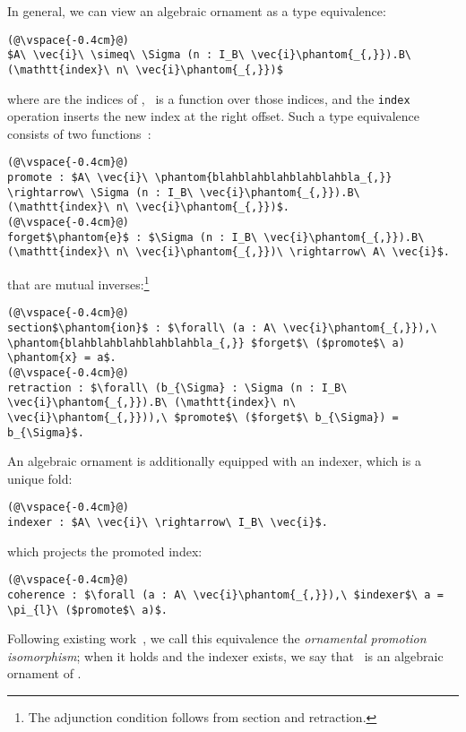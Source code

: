 In general,
we can view an algebraic ornament as a type equivalence: %
\begin{lstlisting}
(@\vspace{-0.4cm}@)
$A\ \vec{i}\ \simeq\ \Sigma (n : I_B\ \vec{i}\phantom{_{,}}).B\ (\mathtt{index}\ n\ \vec{i}\phantom{_{,}})$
\end{lstlisting}
where  are the indices of \Aa, \IB\ is a function over those indices, 
and the \lstinline{index} operation inserts the new index  at the right offset.
Such a type equivalence consists of two functions~\cite{univalent2013homotopy}:
\begin{lstlisting}
(@\vspace{-0.4cm}@)
promote : $A\ \vec{i}\ \phantom{blahblahblahblahblahbla_{,}} \rightarrow\ \Sigma (n : I_B\ \vec{i}\phantom{_{,}}).B\ (\mathtt{index}\ n\ \vec{i}\phantom{_{,}})$.
(@\vspace{-0.4cm}@)
forget$\phantom{e}$ : $\Sigma (n : I_B\ \vec{i}\phantom{_{,}}).B\ (\mathtt{index}\ n\ \vec{i}\phantom{_{,}})\ \rightarrow\ A\ \vec{i}$.
\end{lstlisting}
that are mutual inverses:\footnote{The adjunction condition follows from section and retraction.}
\begin{lstlisting}
(@\vspace{-0.4cm}@)
section$\phantom{ion}$ : $\forall\ (a : A\ \vec{i}\phantom{_{,}}),\ \phantom{blahblahblahblahblahbla_{,}} $forget$\ ($promote$\ a) \phantom{x} = a$.
(@\vspace{-0.4cm}@)
retraction : $\forall\ (b_{\Sigma} : \Sigma (n : I_B\ \vec{i}\phantom{_{,}}).B\ (\mathtt{index}\ n\ \vec{i}\phantom{_{,}})),\ $promote$\ ($forget$\ b_{\Sigma}) = b_{\Sigma}$.
\end{lstlisting}
An algebraic ornament is additionally equipped with an indexer, which is a unique fold:
\begin{lstlisting}
(@\vspace{-0.4cm}@)
indexer : $A\ \vec{i}\ \rightarrow\ I_B\ \vec{i}$.
\end{lstlisting}
which projects the promoted index:
\begin{lstlisting}
(@\vspace{-0.4cm}@)
coherence : $\forall (a : A\ \vec{i}\phantom{_{,}}),\ $indexer$\ a = \pi_{l}\ ($promote$\ a)$.
\end{lstlisting}
Following existing work~\cite{ko2016programming}, we call this equivalence the \textit{ornamental promotion isomorphism}; 
when it holds and the indexer exists, we say that \B\ is an algebraic ornament of \Aa.

